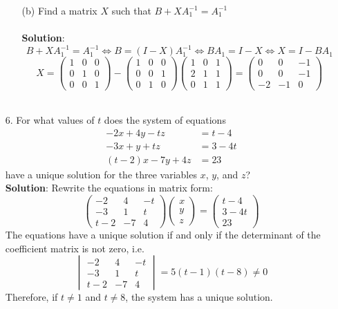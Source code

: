 \documentclass{article}
\begin{document}
\begin{enumerate}
\begin{enumerate}
            \item[(b)] Find a matrix $X$ such that $B+XA_1^{-1}=A_1^{-1}$ \\\\
            \textbf{Solution}:
            $$ B+XA_1^{-1}=A_1^{-1} \Leftrightarrow B = (I-X)A_1^{-1} \Leftrightarrow BA_1=I-X \Leftrightarrow X=I-BA_1 $$
            $$X = \begin{pmatrix}1 &0 &0\\0 &1 &0\\0 &0 &1\end{pmatrix} - \begin{pmatrix}1 &0 &0\\0 &0 &1\\0 &1 &0\end{pmatrix}\begin{pmatrix}1 &0 &1\\2 &1 &1\\0 &1 &1\end{pmatrix} = \begin{pmatrix}0 &0 &-1\\0 &0 &-1\\-2 &-1 &0\end{pmatrix} $$\\
        \end{enumerate}
    
    \item[6. ] For what values of $t$ does the system of equations
                \begin{align*}
                    -2x + 4y -tz &= t - 4 \\
                    -3x + y + tz &= 3 - 4t \\
                    (t-2)x - 7y + 4z &= 23 
                \end{align*}
                have a unique solution for the three variables $x$, $y$, and $z$? \\
                
       \textbf{Solution}: Rewrite the equations in matrix form:
       $$\begin{pmatrix}-2 &4 &-t\\-3 &1 &t\\t-2 &-7 &4\end{pmatrix}\begin{pmatrix}x\\y\\z\end{pmatrix}=\begin{pmatrix}t-4\\3-4t\\23\end{pmatrix}$$
       The equations have a unique solution if and only if the determinant of the coefficient matrix is not zero, i.e.
       $$\begin{vmatrix}-2 &4 &-t\\-3 &1 &t\\t-2 &-7 &4\end{vmatrix}=5(t-1)(t-8) \neq 0$$
       Therefore, if $t \neq 1$ and $t \neq 8$, the system has a unique solution. \\
               

\end{enumerate}
\end{document}
